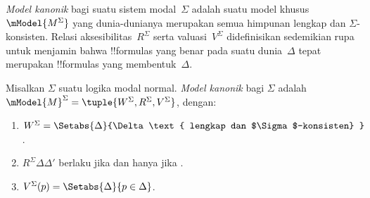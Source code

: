\documentclass[../../../include/open-logic-section]{subfiles}
\begin{document}


\emph{Model kanonik} bagi suatu sistem modal~$\Sigma$ adalah suatu
model khusus~$\mModel{M^\Sigma}$ yang dunia-dunianya merupakan semua himpunan
lengkap dan $\Sigma$-konsisten. Relasi aksesibilitas~$R^\Sigma$ serta
valuasi~$V^\Sigma$ didefinisikan sedemikian rupa untuk menjamin bahwa
!!{formula}s yang benar pada suatu dunia~$\Delta$ tepat merupakan !!{formula}s
yang membentuk~$\Delta$.

\begin{defn}
  Misalkan $\Sigma$ suatu logika modal normal. \emph{Model kanonik} bagi
  $\Sigma$ adalah $\mModel{M}^\Sigma = \tuple{W^\Sigma, R^\Sigma,
    V^\Sigma}$, dengan:
  \begin{enumerate}
  \item $W^\Sigma = \Setabs{ \Delta }{\Delta \text{
      lengkap dan $\Sigma$-konsisten} }$.
  \item $R^\Sigma \Delta\Delta'$ berlaku jika dan hanya jika
    .
  \item $V^\Sigma(p) = \Setabs{\Delta}{p \in \Delta}$.
  \end{enumerate}
\end{defn}
\end{document}
